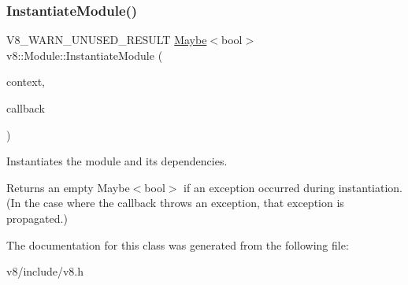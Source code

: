 \subsubsection{\texorpdfstring{Instantiate\+Module()}{InstantiateModule()}}
{\footnotesize\ttfamily V8\+\_\+\+W\+A\+R\+N\+\_\+\+U\+N\+U\+S\+E\+D\+\_\+\+R\+E\+S\+U\+LT \mbox{\hyperlink{classv8_1_1Maybe}{Maybe}}$<$bool$>$ v8\+::\+Module\+::\+Instantiate\+Module (\begin{DoxyParamCaption}\item[{\mbox{\hyperlink{classv8_1_1Local}{Local}}$<$ Context $>$}]{context,  }\item[{Resolve\+Callback}]{callback }\end{DoxyParamCaption})}

Instantiates the module and its dependencies.

Returns an empty Maybe$<$bool$>$ if an exception occurred during instantiation. (In the case where the callback throws an exception, that exception is propagated.) 

The documentation for this class was generated from the following file\+:\begin{DoxyCompactItemize}
\item 
v8/include/v8.\+h\end{DoxyCompactItemize}
